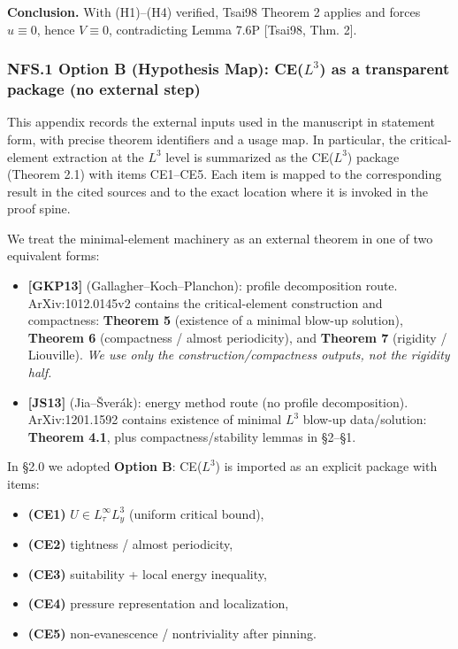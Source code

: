 \documentclass[
  11pt,
]{article}
\providecommand{\tightlist}{%
  \setlength{\itemsep}{0pt}\setlength{\parskip}{0pt}}
\begin{document}
\textbf{Conclusion.} With (H1)--(H4) verified, Tsai98 Theorem 2 applies and forces \(u\equiv 0\), hence \(V\equiv 0\), contradicting Lemma 7.6P {[}Tsai98, Thm. 2{]}.

\hypertarget{nfs.1-option-b-hypothesis-map-cel3-as-a-transparent-package-no-external-step}{%
\subsubsection{\texorpdfstring{NFS.1 Option B (Hypothesis Map): CE(\(L^3\)) as a transparent package (no external step)}{NFS.1 Option B (Hypothesis Map): CE(L\^{}3) as a transparent package (no external step)}}\label{nfs.1-option-b-hypothesis-map-cel3-as-a-transparent-package-no-external-step}}

This appendix records the external inputs used in the manuscript in statement form, with precise theorem identifiers and a usage map. In particular, the critical-element extraction at the \(L^3\) level is summarized as the CE(\(L^3\)) package (Theorem 2.1) with items CE1--CE5. Each item is mapped to the corresponding result in the cited sources and to the exact location where it is invoked in the proof spine.

We treat the minimal-element machinery as an external theorem in one of two equivalent forms:

\begin{itemize}
\item
  \textbf{{[}GKP13{]}} (Gallagher--Koch--Planchon): profile decomposition route. ArXiv:1012.0145v2 contains the critical-element construction and compactness: \textbf{Theorem 5} (existence of a minimal blow-up solution), \textbf{Theorem 6} (compactness / almost periodicity), and \textbf{Theorem 7} (rigidity / Liouville). \emph{We use only the construction/compactness outputs, not the rigidity half.}
\item
  \textbf{{[}JS13{]}} (Jia--Šverák): energy method route (no profile decomposition). ArXiv:1201.1592 contains existence of minimal \(L^3\) blow-up data/solution: \textbf{Theorem 4.1}, plus compactness/stability lemmas in §2--§1.
\end{itemize}

In §2.0 we adopted \textbf{Option B}: CE(\(L^3\)) is imported as an explicit package with items:

\begin{itemize}
\tightlist
\item
  \textbf{(CE1)} \(U\in L^\infty_\tau L^3_y\) (uniform critical bound),
\item
  \textbf{(CE2)} tightness / almost periodicity,
\item
  \textbf{(CE3)} suitability + local energy inequality,
\item
  \textbf{(CE4)} pressure representation and localization,
\item
  \textbf{(CE5)} non-evanescence / nontriviality after pinning.
\end{itemize}
\end{document}
